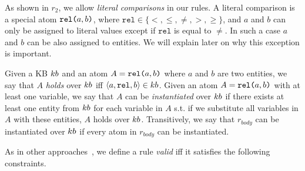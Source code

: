 %
%	

As shown in $r_2$, we allow \emph{literal comparisons} in our rules. A literal comparison is a special atom $\texttt{rel(}a,b\texttt{)}$, where $\texttt{rel} \in \{<,\leq,\neq,>,\geq\}$, and $a$ and $b$ can only be assigned to literal values except if $\texttt{rel}$ is equal to $\neq$. In such a case $a$ and $b$ can be also assigned to entities. We will explain later on why this exception is important.

Given a KB ${\sc kb}$ and an atom $A=\texttt{rel(}a,b\texttt{)}$ where $a$ and $b$ are two entities, we say that $A$ \emph{holds} over ${\sc kb}$ iff $\langle a,\texttt{rel},b\rangle \in {\sc kb}$.
Given %
an atom $A=\texttt{rel(}a,b\texttt{)}$ with at least one variable, we say that $A$ can be \emph{instantiated} over ${\sc kb}$ if there exists at least one entity from ${\sc kb}$ for each variable in $A$ s.t. if we substitute all variables in $A$ with these entities, $A$ holds over ${\sc kb}$. Transitively, %
we say that $r_{body}$ can be instantiated over ${\sc kb}$ if every atom in $r_{body}$ can be instantiated. 

As in other approaches~\cite{galarraga2015fast,Chen:2016}, we define a rule \emph{valid} iff it satisfies the following constraints.

